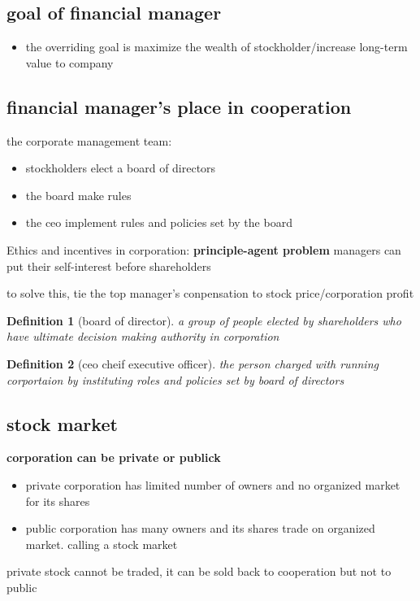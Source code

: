 \documentclass[10pt]{article}
\theoremstyle{break}
\newtheorem{defn}{Definition}[subsection]
\begin{document}
\subsection{goal of financial manager}
\begin{itemize}
    \item the overriding goal is maximize the wealth of stockholder/increase long-term value to company
\end{itemize}
\subsection{financial manager's place in cooperation}
the corporate management team:
\begin{itemize}
    \item stockholders elect a board of directors 
    \item the board make rules 
    \item the ceo implement rules and policies set by the board
\end{itemize}

Ethics and incentives in corporation: 
\textbf{principle-agent problem}
    managers can put their self-interest before shareholders

to solve this, tie the top manager's conpensation to stock price/corporation profit

\begin{defn}[board of director]
    a group of people elected by shareholders who have ultimate decision making authority in corporation 
\end{defn}

\begin{defn}[ceo cheif executive officer]
    the person charged with running corportaion by instituting roles and policies set by board of directors
\end{defn}

\subsection{stock market}
\textbf{corporation can be private or publick}
\begin{itemize}
    \item private corporation has limited number of owners and no organized market for its shares 
    \item public corporation has many owners and its shares trade on organized market. calling a stock market 
\end{itemize}
private stock cannot be traded, it can be sold back to cooperation but not to public
\end{document}

